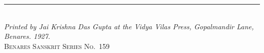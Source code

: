 \documentclass[11pt,a4paper]{article}
\newcommand{\longline}{\noindent\rule{\textwidth}{0.4pt}}
\begin{document}
\vspace{1cm}

\begin{center}
\longline\\[0.3cm]
{\small\textit{Printed by Jai Krishna Das Gupta at the Vidya Vilas Press, Gopalmandir Lane, Benares. 1927.}}\\[0.1cm]
{\small\textsc{Benares Sanskrit Series No.~159}}
\end{center}
\end{document}
